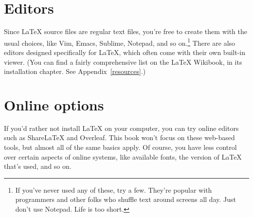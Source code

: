 \section{Editors}

Since \LaTeX{} source files are regular text files,
you're free to create them with the usual choices, like Vim, Emacs,
Sublime, Notepad\plusplus, and so on.\punckern\footnote{If you've never used
any of these, try a few.
They're popular with programmers and other folks who shuffle text around
screens all day. Just don't use Notepad. Life is too short.}
There are also editors designed specifically for \LaTeX{},
which often come with their own built-in  viewer.
(You can find a fairly comprehensive list on the \LaTeX{} Wikibook,
in its installation chapter. See Appendix~\ref{resources}.)

\section{Online options}

If you'd rather not install \LaTeX{} on your computer,
you can try online editors such as Share\LaTeX{} and Overleaf.
This book won't focus on these web-based tools,
but almost all of the same basics apply.
Of course, you have less control over certain aspects of online systems,
like available fonts, the version of \LaTeX{} that's used, and so on.
